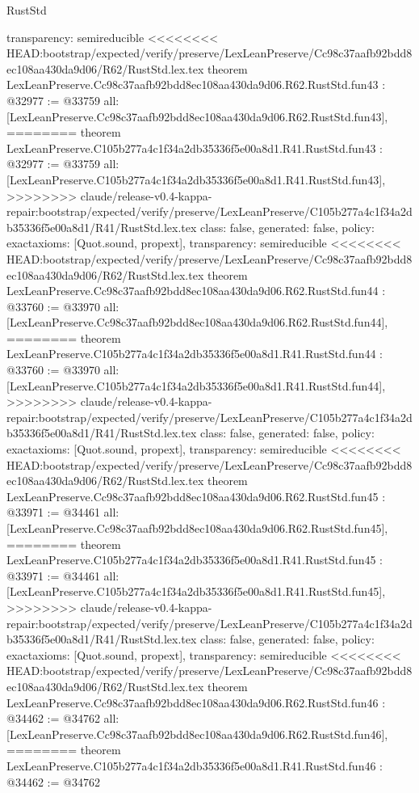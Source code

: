 \begin{lexlean}{RustStd}
\begin{coremodule}
{\begin{coremodule}
{{{{{{{{{{{{{{{{{{{{{{{{{{{{{{{{{{{{{{{{{{{{{{  transparency: semireducible
}
<<<<<<<< HEAD:bootstrap/expected/verify/preserve/LexLeanPreserve/Cc98c37aafb92bdd8ec108aa430da9d06/R62/RustStd.lex.tex
theorem LexLeanPreserve.Cc98c37aafb92bdd8ec108aa430da9d06.R62.RustStd.fun43 : @32977 := @33759 {
  all: [LexLeanPreserve.Cc98c37aafb92bdd8ec108aa430da9d06.R62.RustStd.fun43],
========
theorem LexLeanPreserve.C105b277a4c1f34a2db35336f5e00a8d1.R41.RustStd.fun43 : @32977 := @33759 {
  all: [LexLeanPreserve.C105b277a4c1f34a2db35336f5e00a8d1.R41.RustStd.fun43],
>>>>>>>> claude/release-v0.4-kappa-repair:bootstrap/expected/verify/preserve/LexLeanPreserve/C105b277a4c1f34a2db35336f5e00a8d1/R41/RustStd.lex.tex
  class: false,
  generated: false,
  policy: exact{axioms: [Quot.sound, propext]},
  transparency: semireducible
}
<<<<<<<< HEAD:bootstrap/expected/verify/preserve/LexLeanPreserve/Cc98c37aafb92bdd8ec108aa430da9d06/R62/RustStd.lex.tex
theorem LexLeanPreserve.Cc98c37aafb92bdd8ec108aa430da9d06.R62.RustStd.fun44 : @33760 := @33970 {
  all: [LexLeanPreserve.Cc98c37aafb92bdd8ec108aa430da9d06.R62.RustStd.fun44],
========
theorem LexLeanPreserve.C105b277a4c1f34a2db35336f5e00a8d1.R41.RustStd.fun44 : @33760 := @33970 {
  all: [LexLeanPreserve.C105b277a4c1f34a2db35336f5e00a8d1.R41.RustStd.fun44],
>>>>>>>> claude/release-v0.4-kappa-repair:bootstrap/expected/verify/preserve/LexLeanPreserve/C105b277a4c1f34a2db35336f5e00a8d1/R41/RustStd.lex.tex
  class: false,
  generated: false,
  policy: exact{axioms: [Quot.sound, propext]},
  transparency: semireducible
}
<<<<<<<< HEAD:bootstrap/expected/verify/preserve/LexLeanPreserve/Cc98c37aafb92bdd8ec108aa430da9d06/R62/RustStd.lex.tex
theorem LexLeanPreserve.Cc98c37aafb92bdd8ec108aa430da9d06.R62.RustStd.fun45 : @33971 := @34461 {
  all: [LexLeanPreserve.Cc98c37aafb92bdd8ec108aa430da9d06.R62.RustStd.fun45],
========
theorem LexLeanPreserve.C105b277a4c1f34a2db35336f5e00a8d1.R41.RustStd.fun45 : @33971 := @34461 {
  all: [LexLeanPreserve.C105b277a4c1f34a2db35336f5e00a8d1.R41.RustStd.fun45],
>>>>>>>> claude/release-v0.4-kappa-repair:bootstrap/expected/verify/preserve/LexLeanPreserve/C105b277a4c1f34a2db35336f5e00a8d1/R41/RustStd.lex.tex
  class: false,
  generated: false,
  policy: exact{axioms: [Quot.sound, propext]},
  transparency: semireducible
}
<<<<<<<< HEAD:bootstrap/expected/verify/preserve/LexLeanPreserve/Cc98c37aafb92bdd8ec108aa430da9d06/R62/RustStd.lex.tex
theorem LexLeanPreserve.Cc98c37aafb92bdd8ec108aa430da9d06.R62.RustStd.fun46 : @34462 := @34762 {
  all: [LexLeanPreserve.Cc98c37aafb92bdd8ec108aa430da9d06.R62.RustStd.fun46],
========
theorem LexLeanPreserve.C105b277a4c1f34a2db35336f5e00a8d1.R41.RustStd.fun46 : @34462 := @34762 {
}}}}}}}}}}}}}}}}}}}}}}}}}}}}}}}}}}}}}}}}}}}}}}}}}}
\end{coremodule}}
\end{coremodule}
\end{lexlean}
